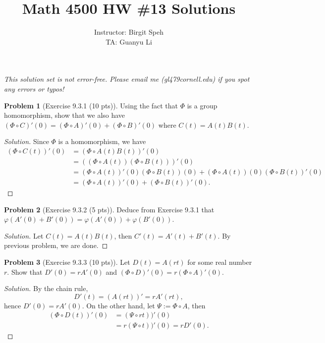 \documentclass{article}
\title{Math 4500 HW \#13 Solutions}
\author{Instructor: Birgit Speh\\ TA: Guanyu Li}
\date{}
\theoremstyle{definition}
\newtheorem{problem}{Problem}
\theoremstyle{plain}
\begin{document}
\maketitle\par

\emph{This solution set is not error-free. Please email me (gl479\MVAt cornell.edu) if you spot any errors or typos!}

\begin{problem}[Exercise 9.3.1 (10 pts)]
Using the fact that $\Phi$ is a group homomorphism, show that we also have $(\Phi\circ C)'(0)=(\Phi\circ A)'(0)+(\Phi\circ B)'(0)$ where $C(t)=A(t)B(t)$.
\end{problem}
\begin{adjustwidth}{0.7cm}{}
\color{blue}
\begin{proof}[Solution]
Since $\Phi$ is a homomorphism, we have
\begin{align*}
(\Phi\circ C(t))'(0)&=(\Phi\circ A(t)B(t))'(0)\\
&=((\Phi\circ A(t))(\Phi\circ B(t)))'(0)\\
&=(\Phi\circ A(t))'(0)(\Phi\circ B(t))(0)+(\Phi\circ A(t))(0)(\Phi\circ B(t))'(0)\\
&=(\Phi\circ A(t))'(0)+(\Phi\circ B(t))'(0).
\end{align*}
\color{black}
\end{proof}
\end{adjustwidth}

\begin{problem}[Exercise 9.3.2 (5 pts)]
Deduce from Exercise 9.3.1 that $\varphi(A'(0)+B'(0))=\varphi(A'(0))+\varphi(B'(0))$.
\end{problem}
\begin{adjustwidth}{0.7cm}{}
\color{blue}
\begin{proof}[Solution]
Let $C(t)=A(t)B(t)$, then $C'(t)=A'(t)+B'(t)$. By previous problem, we are done.
\color{black}
\end{proof}
\end{adjustwidth}

\begin{problem}[Exercise 9.3.3 (10 pts)]
Let $D(t)=A(rt)$ for some real number $r$. Show that $D'(0)=rA'(0)$ and $(\Phi\circ D)'(0)=r(\Phi\circ A)'(0)$.
\end{problem}
\begin{adjustwidth}{0.7cm}{}
\color{blue}
\begin{proof}[Solution]
By the chain rule,
\begin{displaymath}
D'(t)=(A(rt))'=rA'(rt),
\end{displaymath}
hence $D'(0)=rA'(0)$. On the other hand, let $\Psi:=\Phi\circ A$, then
\begin{align*}
(\Phi\circ D(t))'(0)&=(\Psi\circ rt))'(0)\\
&=r(\Psi\circ t))'(0)=rD'(0).
\end{align*}
\color{black}
\end{proof}
\end{adjustwidth}
\end{document}
